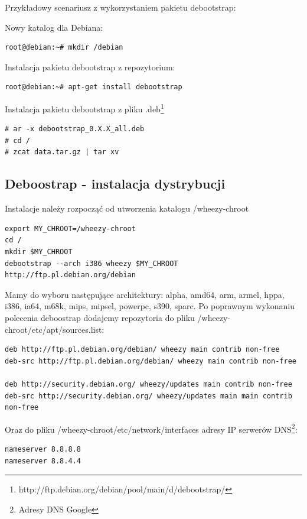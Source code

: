\newline

Przykładowy scenariusz z wykorzystaniem pakietu debootstrap:

Nowy katalog dla Debiana:
\begin{lstlisting}
root@debian:~# mkdir /debian
\end{lstlisting}

\newline

Instalacja pakietu debootstrap z repozytorium:
\begin{lstlisting}
root@debian:~# apt-get install debootstrap
\end{lstlisting}


Instalacja pakietu debootstrap z pliku .deb\footnote{http://ftp.debian.org/debian/pool/main/d/debootstrap/}

\begin{lstlisting}
# ar -x debootstrap_0.X.X_all.deb
# cd /
# zcat data.tar.gz | tar xv
\end{lstlisting}

\subsection{Deboostrap - instalacja dystrybucji}

Instalacje należy rozpocząć od utworzenia katalogu /wheezy-chroot

\begin{lstlisting}
export MY_CHROOT=/wheezy-chroot
cd /
mkdir $MY_CHROOT
debootstrap --arch i386 wheezy $MY_CHROOT http://ftp.pl.debian.org/debian
\end{lstlisting}
Mamy do wyboru następujące architektury: alpha, amd64, arm, armel, hppa, i386, ia64, m68k, mips, mipsel, powerpc, s390, sparc. Po poprawnym wykonaniu polecenia deboostrap dodajemy repozytoria do pliku \newline /wheezy-chroot/etc/apt/sources.list:
\begin{lstlisting}
deb http://ftp.pl.debian.org/debian/ wheezy main contrib non-free
deb-src http://ftp.pl.debian.org/debian/ wheezy main contrib non-free

deb http://security.debian.org/ wheezy/updates main contrib non-free
deb-src http://security.debian.org/ wheezy/updates main main contrib non-free
\end{lstlisting}

Oraz do pliku /wheezy-chroot/etc/network/interfaces adresy IP serwerów DNS\footnote{Adresy DNS Google}:
\begin{lstlisting}
nameserver 8.8.8.8
nameserver 8.8.4.4
\end{lstlisting}

